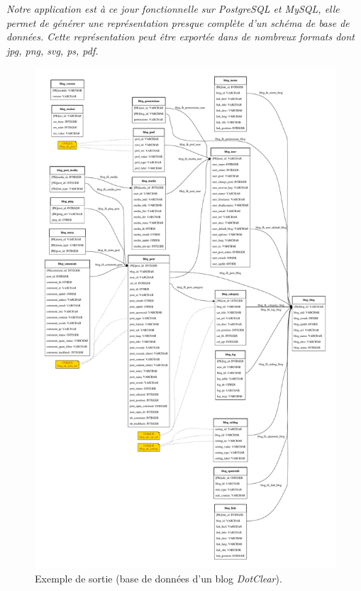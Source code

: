 \textit{Notre application est à ce jour fonctionnelle sur PostgreSQL et MySQL, elle permet de générer une représentation presque complète d'un schéma de base de données. Cette représentation peut être exportée dans de nombreux formats dont jpg, png, svg, ps, pdf.}


\begin{figure}[H]
\centering
\includegraphics[width=\textwidth]{files/exemple_sortie}
\caption{Exemple de sortie (base de données d'un blog \emph{DotClear}).}
\end{figure}